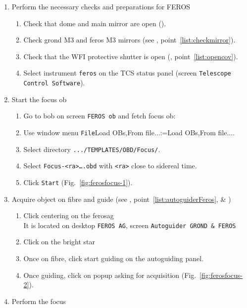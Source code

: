 \documentclass[11pt,fleqn,a4paper]{book}
\makeatletter
\def\menu#1#2{\texttt{#1}\ifx{}#2\else\@for\@x:=#2\do{$\rightarrow$\texttt{\@x}}\fi}
\def\wmenu#1#2{window menu \menu{#1}{#2}}
\def\fetchob{\wmenu{File}{Load OBs,From file...}}
\makeatother
\begin{document}
\label{proc:ferosfocus}
\begin{enumerate}
  \item Perform the necessary checks and preparations for FEROS
  \begin{enumerate}
    \item Check that dome and \gls{main mirror} are open ().\label{list:ferosfocus1}
    \item Check \gls{grond} \gls{M3} and \gls{feros} \gls{M3} mirrors (see , point~\ref{list:checkmirror}).
    \item Check that the WFI \gls{protective shutter} is open (, point~\ref{list:opencov}).
    \item Select instrument \texttt{feros} on the \gls{TCS status panel} (screen \texttt{Telescope Control Software}).
  \end{enumerate}
  \item Start the focus \gls{ob}
  \begin{enumerate}
     \item Go to \gls{bob} on screen \texttt{FEROS \gls{ob}} and fetch \gls{focus} \gls{ob}:
     \item Use \fetchob.
     \item Select directory \texttt{.../TEMPLATES/OBD/Focus/}.
     \item Select \texttt{Focus-<ra>….obd} with \texttt{<ra>} close to sidereal time.
     \item Click \texttt{Start} (Fig.~\ref{fig:ferosfocus-1}).
  \end{enumerate}
  \item Acquire object on fibre and guide (see , point~\ref{list:autoguiderFeros}, \& )
  \begin{enumerate}
     \item Click centering on the \gls{ferosag}\\
           It is located on \gls{desktop} \texttt{FEROS AG}, screen \texttt{Autoguider GROND \& FEROS}
     \item Click on the bright star
     \item Once on fibre, click start guiding on the \gls{autoguiding} panel.
     \item Once guiding, click on popup asking for acquisition (Fig.~\ref{fig:ferosfocus-2}).
  \end{enumerate}
  \item Perform the \gls{focus}
  \begin{enumerate}

\end{enumerate}
\end{enumerate}
\end{document}
